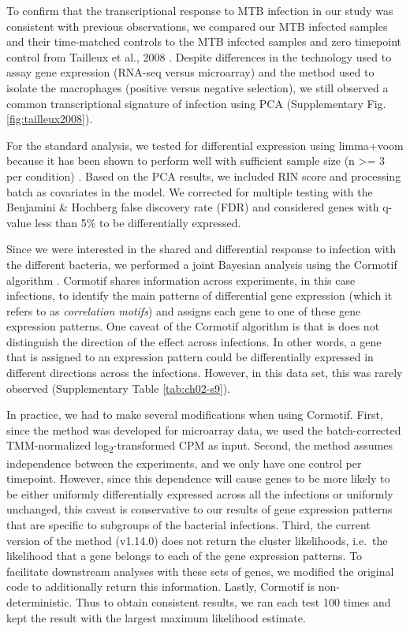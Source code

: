 To confirm that the transcriptional response to MTB infection in our
study was consistent with previous observations, we compared our MTB
infected samples and their time-matched controls to the MTB infected
samples and zero timepoint control from Tailleux et al., 2008
\citep{Tailleux2008}. Despite differences in the technology used to
assay gene expression (RNA-seq versus microarray) and the method used
to isolate the macrophages (positive versus negative selection), we
still observed a common transcriptional signature of infection using
PCA (Supplementary Fig. \ref{fig:tailleux2008}).

For the standard analysis, we tested for differential expression using
limma+voom \citep{Smyth2004, Smyth2005, Law2014} because it has been
shown to perform well with sufficient sample size (n \textgreater{}= 3
per condition) \citep{Rapaport2013, Soneson2013}. Based on the PCA
results, we included RIN score and processing batch as covariates in
the model. We corrected for multiple testing with the Benjamini \&
Hochberg false discovery rate (FDR) \citep{Benjamini1995} and
considered genes with q-value less than 5\% to be differentially
expressed.

Since we were interested in the shared and differential response to
infection with the different bacteria, we performed a joint Bayesian
analysis using the Cormotif algorithm \citep{Wei2015}. Cormotif shares
information across experiments, in this case infections, to identify
the main patterns of differential gene expression (which it refers to
as \emph{correlation motifs}) and assigns each gene to one of these
gene expression patterns. One caveat of the Cormotif algorithm is that
is does not distinguish the direction of the effect across
infections. In other words, a gene that is assigned to an expression
pattern could be differentially expressed in different directions
across the infections.  However, in this data set, this was rarely
observed (Supplementary Table \ref{tab:ch02-s9}).

In practice, we had to make several modifications when using Cormotif.
First, since the method was developed for microarray data, we used the
batch-corrected TMM-normalized log\textsubscript{2}-transformed CPM as
input. Second, the method assumes independence between the
experiments, and we only have one control per timepoint. However,
since this dependence will cause genes to be more likely to be either
uniformly differentially expressed across all the infections or
uniformly unchanged, this caveat is conservative to our results of
gene expression patterns that are specific to subgroups of the
bacterial infections.  Third, the current version of the method
(v1.14.0) does not return the cluster likelihoods, i.e.~the likelihood
that a gene belongs to each of the gene expression patterns. To
facilitate downstream analyses with these sets of genes, we modified
the original code to additionally return this information. Lastly,
Cormotif is non-deterministic. Thus to obtain consistent results, we
ran each test 100 times and kept the result with the largest maximum
likelihood estimate.

